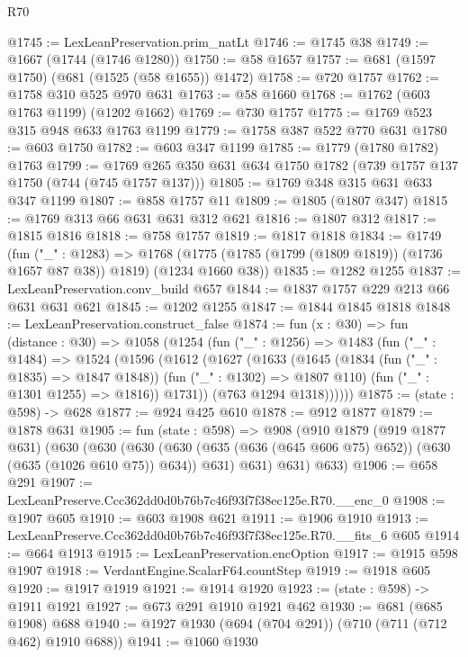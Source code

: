 \begin{lexlean}{R70}
\begin{coremodule}
@1745 := LexLeanPreservation.prim_natLt
@1746 := @1745 @38
@1749 := @1667 (@1744 (@1746 @1280))
@1750 := @58 @1657
@1757 := @681 (@1597 @1750) (@681 (@1525 (@58 @1655)) @1472)
@1758 := @720 @1757
@1762 := @1758 @310 @525 @970 @631
@1763 := @58 @1660
@1768 := @1762 (@603 @1763 @1199) (@1202 @1662)
@1769 := @730 @1757
@1775 := @1769 @523 @315 @948 @633 @1763 @1199
@1779 := @1758 @387 @522 @770 @631
@1780 := @603 @1750
@1782 := @603 @347 @1199
@1785 := @1779 (@1780 @1782) @1763
@1799 := @1769 @265 @350 @631 @634 @1750 @1782 (@739 @1757 @137 @1750 (@744 (@745 @1757 @137)))
@1805 := @1769 @348 @315 @631 @633 @347 @1199
@1807 := @858 @1757 @11
@1809 := @1805 (@1807 @347)
@1815 := @1769 @313 @66 @631 @631 @312 @621
@1816 := @1807 @312
@1817 := @1815 @1816
@1818 := @758 @1757
@1819 := @1817 @1818
@1834 := @1749
    (fun ("_" : @1283) =>
    @1768 (@1775 (@1785 (@1799 (@1809 @1819)) (@1736 @1657 @87 @38)) @1819) (@1234 @1660 @38))
@1835 := @1282 @1255
@1837 := LexLeanPreservation.conv_build @657
@1844 := @1837 @1757 @229 @213 @66 @631 @631 @621
@1845 := @1202 @1255
@1847 := @1844 @1845 @1818
@1848 := LexLeanPreservation.construct_false
@1874 := fun (x : @30) =>
  fun (distance : @30) =>
  @1058
    (@1254
      (fun ("_" : @1256) =>
      @1483
        (fun ("_" : @1484) =>
        @1524
          (@1596
            (@1612
              (@1627
                (@1633
                  (@1645
                    (@1834 (fun ("_" : @1835) => @1847 @1848))
                    (fun ("_" : @1302) => @1807 @110)
                    (fun ("_" : @1301 @1255) => @1816))
                  @1731))
              (@763 @1294 @1318))))))
@1875 := (state : @598) -> @628
@1877 := @924 @425 @610
@1878 := @912 @1877
@1879 := @1878 @631
@1905 := fun (state : @598) =>
  @908
    (@910
      @1879
      (@919 @1877 @631)
      (@630
        (@630
          (@630 (@630 (@635 (@636 (@645 @606 @75) @652)) (@630 (@635 (@1026 @610 @75)) @634)) @631)
          @631)
        @631)
      @633)
@1906 := @658 @291
@1907 := LexLeanPreserve.Ccc362dd0d0b76b7c46f93f7f38ec125e.R70.__enc_0
@1908 := @1907 @605
@1910 := @603 @1908 @621
@1911 := @1906 @1910
@1913 := LexLeanPreserve.Ccc362dd0d0b76b7c46f93f7f38ec125e.R70.__fits_6 @605
@1914 := @664 @1913
@1915 := LexLeanPreservation.encOption
@1917 := @1915 @598 @1907
@1918 := VerdantEngine.ScalarF64.countStep
@1919 := @1918 @605
@1920 := @1917 @1919
@1921 := @1914 @1920
@1923 := (state : @598) -> @1911 @1921
@1927 := @673 @291 @1910 @1921 @462
@1930 := @681 (@685 @1908) @688
@1940 := @1927 @1930 (@694 (@704 @291)) (@710 (@711 (@712 @462) @1910 @688))
@1941 := @1060 @1930

\end{coremodule}
\end{lexlean}
